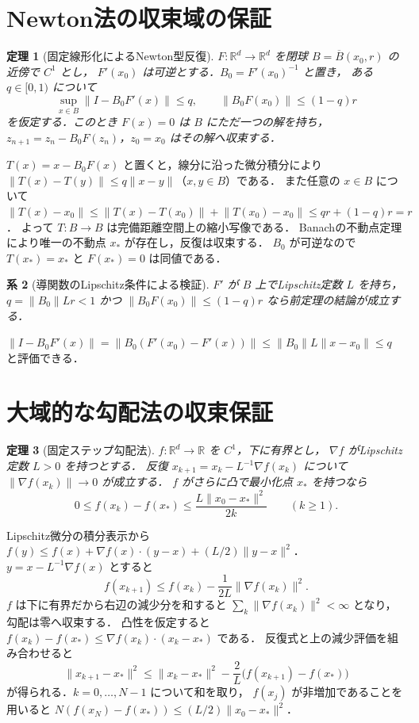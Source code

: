 \documentclass[a5paper,10pt,onecolumn]{jsarticle}
\makeatletter
\theoremstyle{mathnotetheorem}
\newtheorem{theorem}{定理}[section]
\newtheorem{corollary}[theorem]{系}
\renewcommand{\proofname}{証明}
\renewenvironment{proof}[1][\proofname]{%
  \par\pushQED{\qed}\normalfont\topsep4\p@\@plus2\p@\relax
  \trivlist\item[\hskip\labelsep\bfseries #1]\ignorespaces
}{\popQED\endtrivlist\@endpefalse}
\newcommand{\norm}[1]{\lVert #1\rVert}
\makeatother
\begin{document}
\section{Newton法の収束域の保証}
\begin{theorem}[固定線形化によるNewton型反復]
$F:\mathbb R^d\to\mathbb R^d$ を閉球
$B=\overline B(x_0,r)$ の近傍で $C^1$ とし，
$F'(x_0)$ は可逆とする．$B_0=F'(x_0)^{-1}$ と置き，
ある $q\in[0,1)$ について
\[
 \sup_{x\in B}\norm{I-B_0F'(x)}\le q,
 \qquad \norm{B_0F(x_0)}\le(1-q)r
\]
を仮定する．このとき $F(x)=0$ は $B$ にただ一つの解を持ち，
$z_{n+1}=z_n-B_0F(z_n)$，$z_0=x_0$ はその解へ収束する．
\end{theorem}
\begin{proof}
$T(x)=x-B_0F(x)$ と置くと，線分に沿った微分積分により
$\norm{T(x)-T(y)}\le q\norm{x-y}$（$x,y\in B$）である．
また任意の $x\in B$ について
$\norm{T(x)-x_0}\le\norm{T(x)-T(x_0)}+
\norm{T(x_0)-x_0}\le qr+(1-q)r=r$．
よって $T:B\to B$ は完備距離空間上の縮小写像である．
Banachの不動点定理により唯一の不動点 $x_*$ が存在し，反復は収束する．
$B_0$ が可逆なので $T(x_*)=x_*$ と $F(x_*)=0$ は同値である．
\end{proof}
\begin{corollary}[導関数のLipschitz条件による検証]
$F'$ が $B$ 上でLipschitz定数 $L$ を持ち，
$q=\norm{B_0}Lr<1$ かつ
$\norm{B_0F(x_0)}\le(1-q)r$ なら前定理の結論が成立する．
\end{corollary}
\begin{proof}
$\norm{I-B_0F'(x)}=\norm{B_0(F'(x_0)-F'(x))}
\le\norm{B_0}L\norm{x-x_0}\le q$ と評価できる．
\end{proof}
\section{大域的な勾配法の収束保証}
\begin{theorem}[固定ステップ勾配法]
$f:\mathbb R^d\to\mathbb R$ を $C^1$，下に有界とし，
$\nabla f$ がLipschitz定数 $L>0$ を持つとする．
反復 $x_{k+1}=x_k-L^{-1}\nabla f(x_k)$ について
$\norm{\nabla f(x_k)}\to0$ が成立する．
$f$ がさらに凸で最小化点 $x_*$ を持つなら
\[
 0\le f(x_k)-f(x_*)\le\frac{L\norm{x_0-x_*}^2}{2k}
 \qquad(k\ge1).
\]
\end{theorem}
\begin{proof}
Lipschitz微分の積分表示から
$ f(y)\le f(x)+\nabla f(x)\cdot(y-x)+(L/2)\norm{y-x}^2$．
$y=x-L^{-1}\nabla f(x)$ とすると
\[
 f(x_{k+1})\le f(x_k)-\frac1{2L}\norm{\nabla f(x_k)}^2.
\]
$f$ は下に有界だから右辺の減少分を和すると
$\sum_k\norm{\nabla f(x_k)}^2<\infty$ となり，勾配は零へ収束する．
凸性を仮定すると
$f(x_k)-f(x_*)\le\nabla f(x_k)\cdot(x_k-x_*)$ である．
反復式と上の減少評価を組み合わせると
\[
 \norm{x_{k+1}-x_*}^2
 \le\norm{x_k-x_*}^2
 -\frac2L\bigl(f(x_{k+1})-f(x_*)\bigr)
\]
が得られる．$k=0,\ldots,N-1$ について和を取り，
$f(x_j)$ が非増加であることを用いると
$N(f(x_N)-f(x_*))\le(L/2)\norm{x_0-x_*}^2$．
\end{proof}
\end{document}
